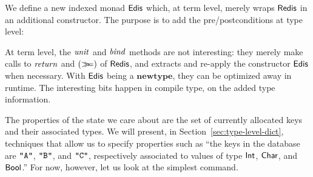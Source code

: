We define a new indexed monad \ensuremath{\Conid{Edis}} which, at term level, merely wraps
\ensuremath{\Conid{Redis}} in an additional constructor. The purpose is to add the
pre/postconditions at type level:
\resethooks
At term level, the \ensuremath{\Varid{unit}} and \ensuremath{\Varid{bind}} methods are not interesting: they merely
make calls to \ensuremath{\Varid{return}} and \ensuremath{(\bind )} of \ensuremath{\Conid{Redis}}, and extracts and re-apply the constructor \ensuremath{\Conid{Edis}} when necessary. With \ensuremath{\Conid{Edis}} being a \ensuremath{\mathbf{newtype}}, they
can be optimized away in runtime. The interesting bits happen in compile type,
on the added type information.

The properties of the state we care about are the set of currently allocated
keys and their associated types. We will present, in Section~\ref{sec:type-level-dict}, techniques that allow us to specify
properties such as ``the keys in the database are \ensuremath{\text{\tt \char34 A\char34}}, \ensuremath{\text{\tt \char34 B\char34}}, and \ensuremath{\text{\tt \char34 C\char34}},
respectively associated to values of type \ensuremath{\Conid{Int}}, \ensuremath{\Conid{Char}}, and \ensuremath{\Conid{Bool}}.''
For now, however, let us look at the simplest \Redis{} command.

